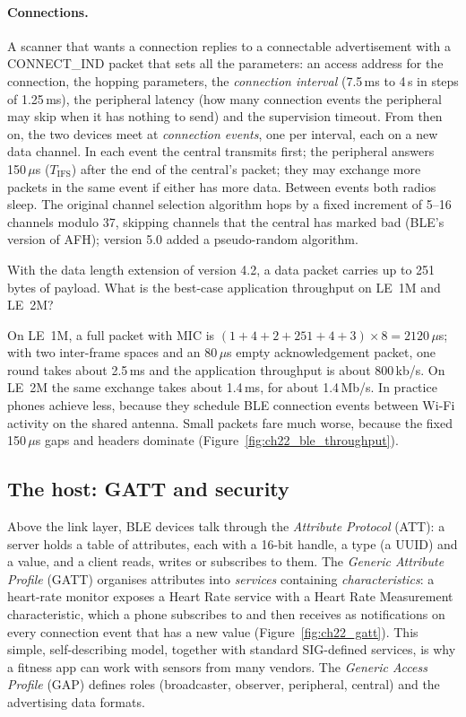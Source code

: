 \paragraph{Connections.} A scanner that wants a connection replies to a connectable advertisement
with a CONNECT\_IND packet that sets all the parameters: an access address for the connection, the
hopping parameters, the \emph{connection interval} (7.5\,ms to 4\,s in steps of 1.25\,ms), the
peripheral latency (how many connection events the peripheral may skip when it has nothing to send)
and the supervision timeout. From then on, the two devices meet at \emph{connection events}, one per
interval, each on a new data channel. In each event the central transmits first; the peripheral
answers 150\,$\mu$s ($T_{\text{IFS}}$) after the end of the central's packet; they may exchange more
packets in the same event if either has more data. Between events both radios sleep. The original
channel selection algorithm hops by a fixed increment of 5--16 channels modulo 37, skipping channels
that the central has marked bad (BLE's version of AFH); version 5.0 added a pseudo-random algorithm.

\begin{worked}
With the data length extension of version 4.2, a data packet carries up to 251 bytes of payload.
What is the best-case application throughput on LE~1M and LE~2M?

On LE~1M, a full packet with MIC is $(1+4+2+251+4+3)\times8=2120\,\mu$s; with two inter-frame spaces
and an 80\,$\mu$s empty acknowledgement packet, one round takes about 2.5\,ms and the application
throughput is about 800\,kb/s. On LE~2M the same exchange takes about 1.4\,ms, for about 1.4\,Mb/s.
In practice phones achieve less, because they schedule BLE connection events between Wi-Fi
activity on the shared antenna. Small packets fare much worse, because the fixed 150\,$\mu$s gaps and
headers dominate (Figure~\ref{fig:ch22_ble_throughput}).
\end{worked}

\subsection{The host: GATT and security}

Above the link layer, BLE devices talk through the \emph{Attribute Protocol} (ATT): a server holds a
table of attributes, each with a 16-bit handle, a type (a UUID) and a value, and a client reads,
writes or subscribes to them. The \emph{Generic Attribute Profile} (GATT) organises attributes into
\emph{services} containing \emph{characteristics}: a heart-rate monitor exposes a Heart Rate service
with a Heart Rate Measurement characteristic, which a phone subscribes to and then receives as
notifications on every connection event that has a new value (Figure~\ref{fig:ch22_gatt}). This
simple, self-describing model, together with standard SIG-defined services, is why a fitness app can
work with sensors from many vendors. The \emph{Generic Access Profile} (GAP) defines roles
(broadcaster, observer, peripheral, central) and the advertising data formats.

